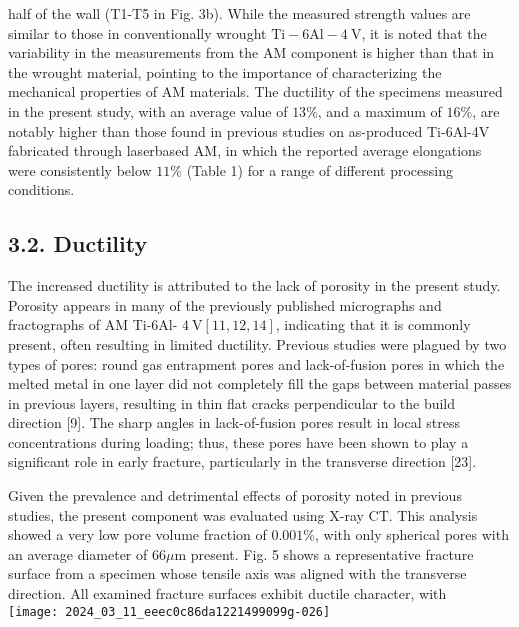 \documentclass[10pt]{article}
\begin{document}
half of the wall (T1-T5 in Fig. 3b). While the measured strength values are similar to those in conventionally wrought $\mathrm{Ti}-6 \mathrm{Al}-4 \mathrm{~V}$, it is noted that the variability in the measurements from the AM component is higher than that in the wrought material, pointing to the importance of characterizing the mechanical properties of AM materials. The ductility of the specimens measured in the present study, with an average value of $13 \%$, and a maximum of $16 \%$, are notably higher than those found in previous studies on as-produced Ti-6Al-4V fabricated through laserbased AM, in which the reported average elongations were consistently below $11 \%$ (Table 1) for a range of different processing conditions.

\subsection*{3.2. Ductility}
The increased ductility is attributed to the lack of porosity in the present study. Porosity appears in many of the previously published micrographs and fractographs of $\mathrm{AM}$ Ti-6Al- $4 \mathrm{~V}[11,12,14]$, indicating that it is commonly present, often resulting in limited ductility. Previous studies were plagued by two types of pores: round gas entrapment pores and lack-of-fusion pores in which the melted metal in one layer did not completely fill the gaps between material passes in previous layers, resulting in thin flat cracks perpendicular to the build direction [9]. The sharp angles in lack-of-fusion pores result in local stress concentrations during loading; thus, these pores have been shown to play a significant role in early fracture, particularly in the transverse direction [23].

Given the prevalence and detrimental effects of porosity noted in previous studies, the present component was evaluated using X-ray CT. This analysis showed a very low pore volume fraction of $0.001 \%$, with only spherical pores with an average diameter of $66 \mu \mathrm{m}$ present. Fig. 5 shows a representative fracture surface from a specimen whose tensile axis was aligned with the transverse direction. All examined fracture surfaces exhibit ductile character, with\\
\texttt{[image: 2024\_03\_11\_eeec0c86da1221499099g-026]}
\end{document}
